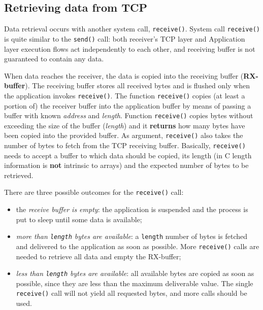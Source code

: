\documentclass[10pt]{book}
\begin{document}
\subsection{Retrieving data from TCP}

Data retrieval occurs with another system call, \texttt{receive()}. System call
\texttt{receive()} is quite similar to the \texttt{send()} call: both
receiver's TCP layer and Application layer execution flows act independently to
each other, and receiving buffer is not guaranteed to contain any data.

When data reaches the receiver, the data is copied into the receiving buffer
(\textbf{RX-buffer}). The receiving buffer stores all received bytes and is
flushed only when the application invokes \texttt{receive()}. The function
\texttt{receive()} copies (at least a portion of) the receiver buffer into the
application buffer by means of passing a buffer with known \emph{address} and
\emph{length}. Function \texttt{receive()} copies bytes without exceeding the
size of the buffer (\emph{length}) and it \textbf{returns} how many bytes have
been copied into the provided buffer. As argument, \texttt{receive()} also
takes the number of bytes to fetch from the TCP receiving buffer. Basically,
\texttt{receive()} needs to accept a buffer to which data should be copied, its
length (in C length information is \textbf{not} intrinsic to arrays) and the
expected number of bytes to be retrieved.

There are three possible outcomes for the \texttt{receive()} call:

\begin{itemize}
    \item the \emph{receive buffer is empty}: the application is suspended and
        the process is put to sleep until some data is available;
    \item \emph{more than \texttt{length} bytes are available}: a
        \texttt{length} number of bytes is fetched and delivered to the
        application as soon as possible. More \texttt{receive()} calls are
        needed to retrieve all data and empty the RX-buffer;
    \item \emph{less than \texttt{length} bytes are available}: all available
        bytes are copied as soon as possible, since they are less than the
        maximum deliverable value. The single \texttt{receive()} call will not
        yield all requested bytes, and more calls should be used.
\end{itemize}
\end{document}
